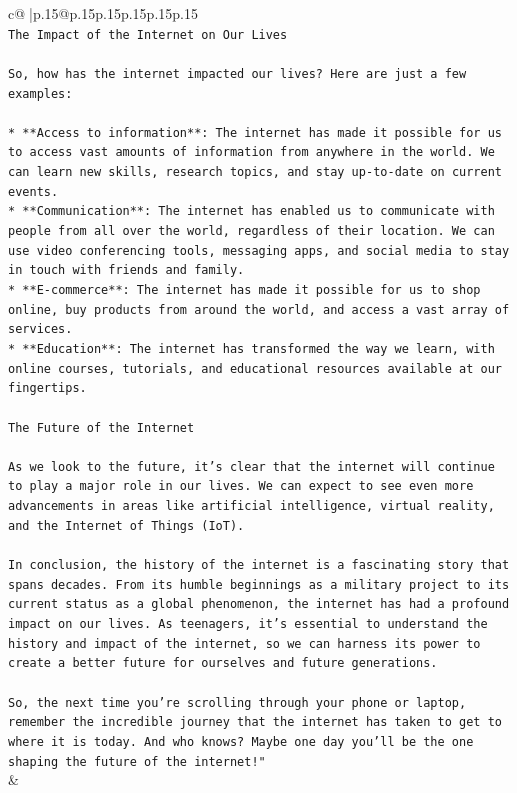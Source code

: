 \documentclass{article}
\begin{document}
{\begin{supertabular}{c@{$\;$}|p{.15\linewidth}@{}p{.15\linewidth}p{.15\linewidth}p{.15\linewidth}p{.15\linewidth}p{.15\linewidth}}
{{{\\ 
\texttt{The Impact of the Internet on Our Lives} \\
\\ 
\texttt{So, how has the internet impacted our lives? Here are just a few examples:} \\
\\ 
\texttt{* **Access to information**: The internet has made it possible for us to access vast amounts of information from anywhere in the world. We can learn new skills, research topics, and stay up{-}to{-}date on current events.} \\
\texttt{* **Communication**: The internet has enabled us to communicate with people from all over the world, regardless of their location. We can use video conferencing tools, messaging apps, and social media to stay in touch with friends and family.} \\
\texttt{* **E{-}commerce**: The internet has made it possible for us to shop online, buy products from around the world, and access a vast array of services.} \\
\texttt{* **Education**: The internet has transformed the way we learn, with online courses, tutorials, and educational resources available at our fingertips.} \\
\\ 
\texttt{The Future of the Internet} \\
\\ 
\texttt{As we look to the future, it's clear that the internet will continue to play a major role in our lives. We can expect to see even more advancements in areas like artificial intelligence, virtual reality, and the Internet of Things (IoT).} \\
\\ 
\texttt{In conclusion, the history of the internet is a fascinating story that spans decades. From its humble beginnings as a military project to its current status as a global phenomenon, the internet has had a profound impact on our lives. As teenagers, it's essential to understand the history and impact of the internet, so we can harness its power to create a better future for ourselves and future generations.} \\
\\ 
\texttt{So, the next time you're scrolling through your phone or laptop, remember the incredible journey that the internet has taken to get to where it is today. And who knows? Maybe one day you'll be the one shaping the future of the internet!"} \\
            }
        }
    }
    & \\ \\


\end{supertabular}}
\end{document}
